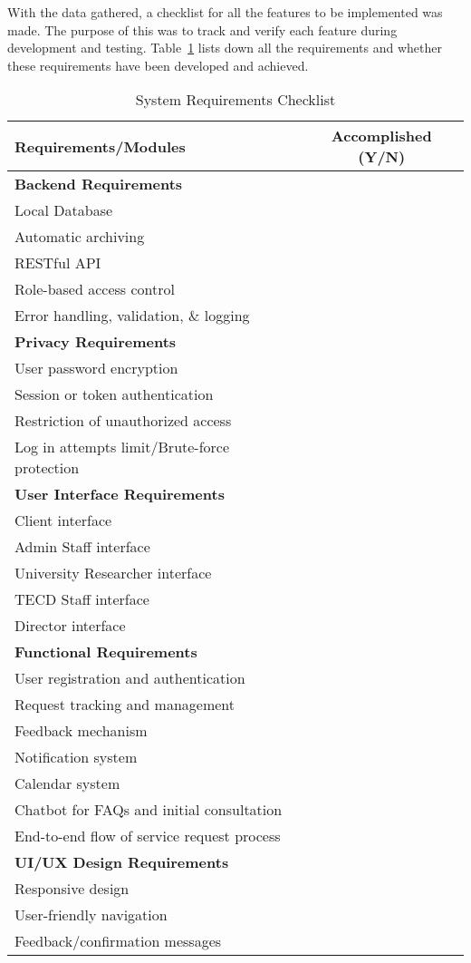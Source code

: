 With the data gathered, a checklist for all the features to be implemented was made. The purpose of this was to track and verify each feature during development and testing. Table~\ref{tab:requirements} lists down all the requirements and whether these requirements have been developed and achieved.

\newpage

\begin{table}[ht]
	\centering
	\begin{tabular}{|p{10cm}|c|}
		\hline
		\textbf{Requirements/Modules} & \textbf{Accomplished (Y/N)} \\
		\hline
		\multicolumn{2}{|l|}{\textbf{Backend Requirements}} \\
		\hline
		Local Database & \\
		Automatic archiving & \\
		RESTful API & \\
		Role-based access control & \\
		Error handling, validation, \& logging & \\
		\hline
		\multicolumn{2}{|l|}{\textbf{Privacy Requirements}} \\
		\hline
		User password encryption & \\
		Session or token authentication & \\
		Restriction of unauthorized access & \\
		Log in attempts limit/Brute-force protection & \\
		\hline
		\multicolumn{2}{|l|}{\textbf{User Interface Requirements}} \\
		\hline
		Client interface & \\
		Admin Staff interface & \\
		University Researcher interface & \\
		TECD Staff interface & \\
		Director interface & \\
		\hline
		\multicolumn{2}{|l|}{\textbf{Functional Requirements}} \\
		\hline
		User registration and authentication & \\
		Request tracking and management & \\
		Feedback mechanism & \\
		Notification system & \\
		Calendar system & \\
		Chatbot for FAQs and initial consultation & \\
		End-to-end flow of service request process & \\
		\hline
		\multicolumn{2}{|l|}{\textbf{UI/UX Design Requirements}} \\
		\hline
		Responsive design & \\
		User-friendly navigation & \\
		Feedback/confirmation messages & \\
		\hline
	\end{tabular}
	\caption{System Requirements Checklist}
	\label{tab:requirements}
\end{table}

